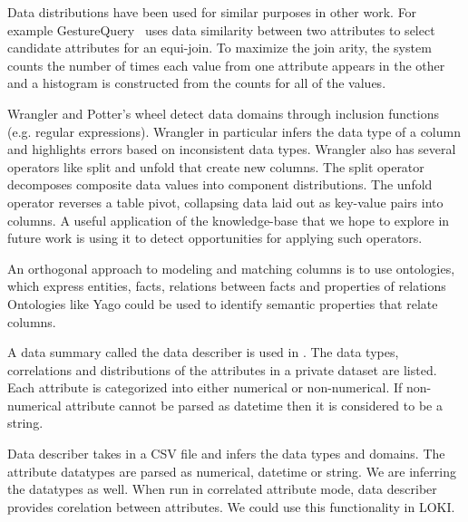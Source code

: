 
Data distributions have been used for similar purposes in other work.  
For example GestureQuery~\cite{nandi2013gestural} uses data similarity between two attributes to select candidate attributes for an equi-join.  
To maximize the join arity, the system counts the number of times each value from one attribute appears in the other and a histogram is constructed from the counts for all of the values.

Wrangler \cite{kandel2011wrangler} and Potter's wheel \cite{raman2001potter} detect data domains through inclusion functions (e.g. regular expressions).
Wrangler in particular infers the data type of a column and highlights errors based on inconsistent data types. 
Wrangler also has several operators like split and unfold that create new columns.
The split operator decomposes composite data values into component distributions.  
The unfold operator reverses a table pivot, collapsing data laid out as key-value pairs into columns.  
A useful application of the \systemname knowledge-base that we hope to explore in future work is using it to detect opportunities for applying such operators.


An orthogonal approach to modeling and matching columns is to use ontologies, which express entities, facts, relations between facts and properties of relations
Ontologies like Yago \cite{fabian2007yago} could be used to identify semantic properties that relate columns.

A data summary called the data describer is used in \cite{ping2017datasynthesizer}. The data types, correlations and distributions of the attributes in a private dataset are listed. Each attribute is categorized into either numerical or non-numerical. If non-numerical attribute cannot be parsed as datetime then it is considered to be a string.

Data describer takes in a CSV file and infers the data types and domains. The attribute datatypes are parsed as numerical, datetime or string. We are inferring the datatypes as well. When run in correlated attribute mode, data describer provides corelation between attributes. We could use this functionality in LOKI.


